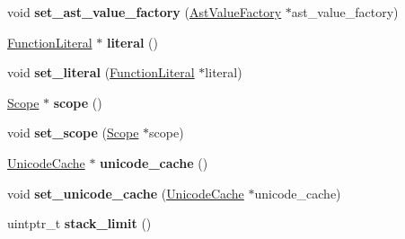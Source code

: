 \begin{DoxyCompactItemize}
\item 
void {\bfseries set\+\_\+ast\+\_\+value\+\_\+factory} (\hyperlink{classv8_1_1internal_1_1_ast_value_factory}{Ast\+Value\+Factory} $\ast$ast\+\_\+value\+\_\+factory)\hypertarget{classv8_1_1internal_1_1_parse_info_a13e8a6d83cd67655b1431aa277055797}{}\label{classv8_1_1internal_1_1_parse_info_a13e8a6d83cd67655b1431aa277055797}

\item 
\hyperlink{classv8_1_1internal_1_1_function_literal}{Function\+Literal} $\ast$ {\bfseries literal} ()\hypertarget{classv8_1_1internal_1_1_parse_info_a485a08c77bdcd518e5de415c162dd09b}{}\label{classv8_1_1internal_1_1_parse_info_a485a08c77bdcd518e5de415c162dd09b}

\item 
void {\bfseries set\+\_\+literal} (\hyperlink{classv8_1_1internal_1_1_function_literal}{Function\+Literal} $\ast$literal)\hypertarget{classv8_1_1internal_1_1_parse_info_aefb7ee3ef914dcec6fd750426e3885ce}{}\label{classv8_1_1internal_1_1_parse_info_aefb7ee3ef914dcec6fd750426e3885ce}

\item 
\hyperlink{classv8_1_1internal_1_1_scope}{Scope} $\ast$ {\bfseries scope} ()\hypertarget{classv8_1_1internal_1_1_parse_info_ad53c6a151bef73b645028916d52b79e1}{}\label{classv8_1_1internal_1_1_parse_info_ad53c6a151bef73b645028916d52b79e1}

\item 
void {\bfseries set\+\_\+scope} (\hyperlink{classv8_1_1internal_1_1_scope}{Scope} $\ast$scope)\hypertarget{classv8_1_1internal_1_1_parse_info_a7bbf3281ea1b4fb101034ca55986f960}{}\label{classv8_1_1internal_1_1_parse_info_a7bbf3281ea1b4fb101034ca55986f960}

\item 
\hyperlink{classv8_1_1internal_1_1_unicode_cache}{Unicode\+Cache} $\ast$ {\bfseries unicode\+\_\+cache} ()\hypertarget{classv8_1_1internal_1_1_parse_info_a2d96c1973a68ede77a276b9b576222e8}{}\label{classv8_1_1internal_1_1_parse_info_a2d96c1973a68ede77a276b9b576222e8}

\item 
void {\bfseries set\+\_\+unicode\+\_\+cache} (\hyperlink{classv8_1_1internal_1_1_unicode_cache}{Unicode\+Cache} $\ast$unicode\+\_\+cache)\hypertarget{classv8_1_1internal_1_1_parse_info_a5101a9924b3cf7bdbbdd1e060c2ef3ad}{}\label{classv8_1_1internal_1_1_parse_info_a5101a9924b3cf7bdbbdd1e060c2ef3ad}

\item 
uintptr\+\_\+t {\bfseries stack\+\_\+limit} ()\hypertarget{classv8_1_1internal_1_1_parse_info_aac931298a39fa07fc0a505b9c1c9c508}{}\label{classv8_1_1internal_1_1_parse_info_aac931298a39fa07fc0a505b9c1c9c508}


\end{DoxyCompactItemize}
